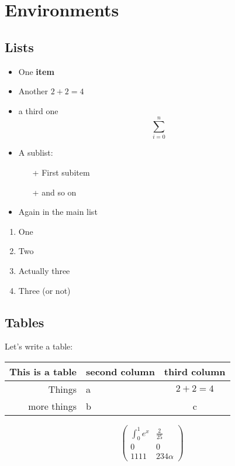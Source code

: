 \documentclass[10pt,a4paper]{article}
\theoremstyle{definition}
\theoremstyle{remark}
\begin{document}
\section{Environments}

\subsection{Lists}
\label{subsectionLists}

\begin{itemize}
	\item One \textbf{item}
	\item Another \(2+2=4\)
	\item a third one \[\sum_{i=0}^n\]
	\item A sublist:
		\begin{itemize}
			\item[+] First subitem
			\item[+] and so on
		\end{itemize}
	\item Again in the main list
\end{itemize}

\begin{enumerate}[label=\Roman*]
	\item One
	\item Two
	\item Actually three
	\item Three (or not)
\end{enumerate}

\subsection*{Tables}

Let's write a table:

\vspace{1cm}
\begin{tabular}{r||l|c}
\hline
This is a table & second column & third column \\
\hline
Things          & a             & \( 2+2 = 4 \)\\
\hline
more things     & b             & c
\end{tabular}

\vspace{1cm}
\[
	\left(\begin{array}{cc}
		\int_0^1 e^x  &  \frac{2}{25} \\
		0 & 0 \\
		1111 & 234\alpha
	\end{array}\right)
\]
\end{document}
